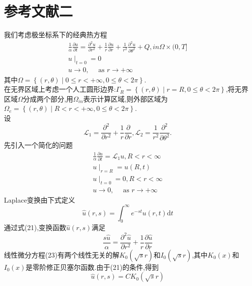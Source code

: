 \documentclass[a4paper,15pt,twoside,zihao=-4]{article}
\begin{document}
\section*{参考文献二}
\indent 我们考虑极坐标系下的经典热方程
\begin{equation}
\begin{array}{l}
\displaystyle\frac{1}{\alpha} \frac{\partial u}{\partial t}=\frac{\partial^2u}{\partial r^2}+
\frac{1}{r}\frac{\partial u}{\partial r}+\frac{1}{r^2}\frac{\partial^2u}{\partial \theta^2}+Q, in \Omega \times(0, T] \\
u\mid_{t=0}=0 \\
u\rightarrow 0, \quad \text { as }r\rightarrow+\infty
\end{array}
\end{equation}
其中$\Omega=\left\{(r,\theta )\mid0\le r<+\infty ,0\le\theta <2\pi \right\}.$\\
\indent 在无界区域上考虑一个人工圆形边界:$\Gamma_R=\left\{(r,\theta )\mid r=R,0\le\theta <2\pi \right\}$,将无界区域$\Omega$分成两个部分,用$\Omega_{in}$表示计算区域,则外部区域为$\Omega_e=\left\{(r,\theta )\mid R<r<+\infty,0\le\theta <2\pi \right\}$.\\
\indent 设
$$\mathcal{L}_1=\frac{\partial^2}{\partial r^2}+\frac{1}{r}\frac{\partial }{\partial r} ,
\mathcal{L}_2=\frac{1}{r^2}\frac{\partial^2}{\partial \theta^2}.$$
\indent 先引入一个简化的问题
\begin{equation}
\begin{array}{l}
\displaystyle\frac{1}{\alpha} \frac{\partial u}{\partial t}=\mathcal{L}_1u,R<r<\infty  \\
u\mid_{r=R}=u(R,t) \\
u\mid_{t=0}=0, R<r<\infty\\
u\rightarrow 0, \quad \text { as }r\rightarrow+\infty
\end{array}
\end{equation}
\indent Laplace变换由下式定义
\begin{equation}
\hat{u}(r,s)=\int_{0}^{\infty }e^{-st}u(r,t)\mathrm{d}t
\end{equation}
\indent 通过式(21),变换函数$\hat{u}(r,s)$满足
\begin{equation}
\frac{s\hat{u}}{\alpha}= \frac{\partial^2\hat{u}}{\partial r^2}+
\frac{1}{r}\frac{\partial \hat{u}}{\partial r}
\end{equation}
\indent 线性微分方程(23)有两个线性无关的解$K_0(\sqrt{s}r)$和$I_0(\sqrt{s}r)$,其中$K_0(x)$和$I_0(x)$是零阶修正贝塞尔函数.由于(21)的条件,得到
\begin{equation}
\hat{u}(r,s)=CK_0(\sqrt{s}r)
\end{equation}
\end{document}
